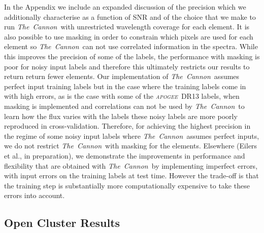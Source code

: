 \documentclass[14pt, preprint2]{aastex6}
\newcommand{\project}[1]{\textsl{#1}}
\newcommand{\tc}{\project{The~Cannon}}
\newcommand{\apogee}{\project{\textsc{apogee}}}
\begin{document}
In the Appendix we include an expanded discussion of the precision which we additionally characterise as a function of SNR and of the choice that we make to run \tc\ with unrestricted wavelength coverage for each element. It is also possible to use masking in order to constrain which pixels are used for each element so \tc\ can not use correlated information in the spectra. While this improves the precision of some of the labels, the performance with masking is poor for noisy input labels and therefore this ultimately restricts our results to return return fewer elements. Our implementation of \tc\ assumes perfect input training labels but in the case where the training labels come in with high errors, as is the case with some of the \apogee\ DR13 labels, when masking is implemented and correlations can not be used by \tc\ to learn how the flux varies with the labels these noisy labels are more poorly reproduced in cross-validation. Therefore, for achieving the highest precision in the regime of some noisy input labels where \tc\ assumes perfect inputs, we do not restrict \tc\ with masking for the elements. Elsewhere (Eilers et al., in preparation), we demonstrate the improvements in performance and flexibility that are obtained  with \tc\ by implementing imperfect errors, with input errors on the training labels at test time. However the trade-off is that the training step is substantially more computationally expensive to take these errors into account. 

\subsection{Open Cluster Results} 
\end{document}

